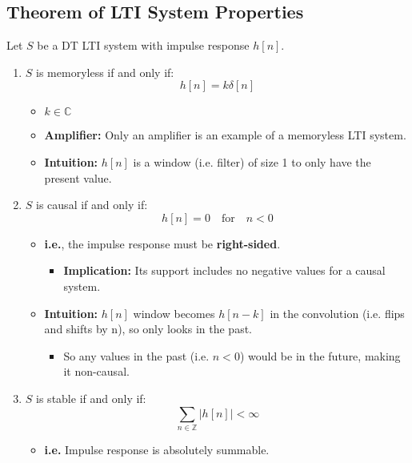 \subsection{Theorem of LTI System Properties}
\begin{theorem}
    Let $S$ be a DT LTI system with impulse response $h[n]$.
    \begin{enumerate}
        \item $S$ is memoryless if and only if:
        \[
        h[n] = k \delta[n]
        \]
        \begin{itemize}
            \item $k \in \mathbb{C}$ 
            \item \textbf{Amplifier:} Only an amplifier is an example of a memoryless LTI system.
            \item \textbf{Intuition:} $h[n]$ is a window (i.e. filter) of size 1 to only have the present value. 
        \end{itemize}
        \vspace{1em}
        
        \item $S$ is causal if and only if:
        \[
        h[n] = 0 \quad \text{for} \quad n < 0
        \]
        \begin{itemize}
            \item \textbf{i.e.}, the impulse response must be \textbf{right-sided}.
            \begin{itemize}
                \item \textbf{Implication:} Its support includes no negative values for a causal system.
            \end{itemize}
            \item \textbf{Intuition:} $h[n]$ window becomes $h[n-k]$ in the convolution (i.e. flips and shifts by n), so only looks in the past. 
            \begin{itemize}
                \item So any values in the past (i.e. $n<0$) would be in the future, making it non-causal.
            \end{itemize}
        \end{itemize}
        \vspace{1em}
        
        \item $S$ is stable if and only if:
        \[
        \sum_{n \in \mathbb{Z}} |h[n]| < \infty
        \]
        \begin{itemize}
            \item \textbf{i.e.} Impulse response is absolutely summable.
        \end{itemize}
        \vspace{1em}
        

\end{enumerate}
\end{theorem}
